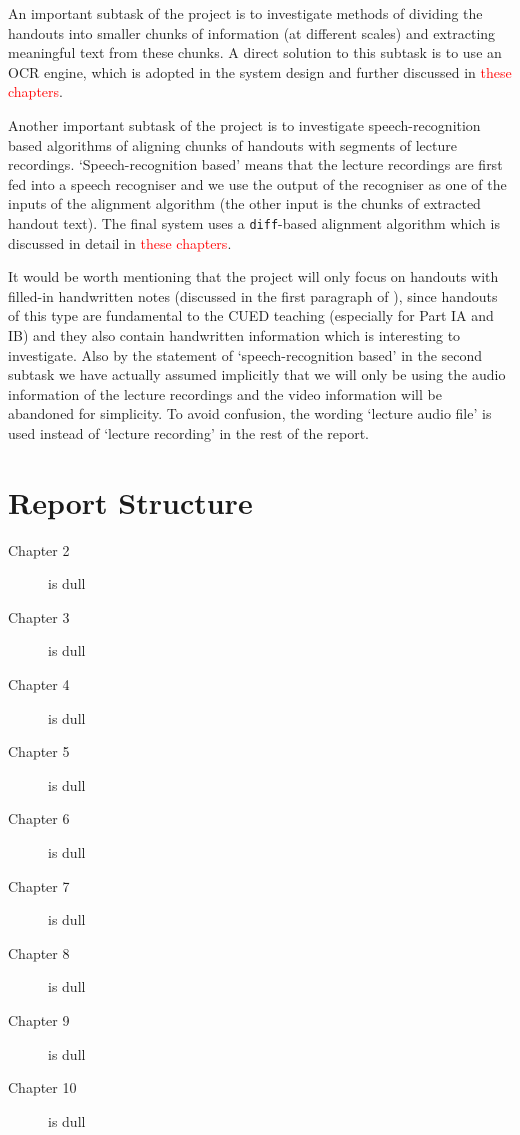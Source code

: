 An important subtask of the project is to investigate methods of dividing the handouts into smaller chunks of information (at different scales) and extracting meaningful text from these chunks. A direct solution to this subtask is to use an OCR engine, which is adopted in the system design and further discussed in \textcolor{red}{these chapters}.

Another important subtask of the project is to investigate speech-recognition based algorithms of aligning chunks of handouts with segments of lecture recordings. `Speech-recognition based' means that the lecture recordings are first fed into a speech recogniser and we use the output of the recogniser as one of the inputs of the alignment algorithm (the other input is the chunks of extracted handout text). The final system uses a \texttt{diff}-based alignment algorithm which is discussed in detail in \textcolor{red}{these chapters}.

It would be worth mentioning that the project will only focus on handouts with filled-in handwritten notes (discussed in the first paragraph of ), since handouts of this type are fundamental to the CUED teaching (especially for Part IA and IB) and they also contain handwritten information which is interesting to investigate. Also by the statement of `speech-recognition based' in the second subtask we have actually assumed implicitly that we will only be using the audio information of the lecture recordings and the video information will be abandoned for simplicity. To avoid confusion, the wording `lecture audio file' is used instead of `lecture recording' in the rest of the report.


\section{Report Structure}

\begin{description}
\item[Chapter 2] is dull
\item[Chapter 3] is dull
\item[Chapter 4] is dull
\item[Chapter 5] is dull
\item[Chapter 6] is dull
\item[Chapter 7] is dull
\item[Chapter 8] is dull
\item[Chapter 9] is dull
\item[Chapter 10] is dull
\end{description}



